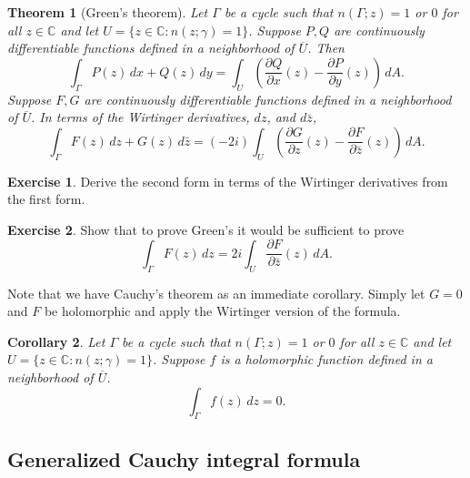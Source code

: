 \documentclass[12pt,openany]{book}
\newcommand{\C}{{\mathbb{C}}}
\theoremstyle{plain}
\newtheorem{thm}{Theorem}[section]
\newtheorem{cor}[thm]{Corollary}
\theoremstyle{remark}
\theoremstyle{definition}
\newenvironment{exbox}{%
    \def\FrameCommand{\vrule width 1pt \relax\hspace {10pt}}%
    \MakeFramed {\advance \hsize -\width \FrameRestore }%
}{%
    \endMakeFramed
}
\theoremstyle{exercise}
\newtheorem{exercise}{Exercise}[section]
\theoremstyle{example}
\begin{document}
\begin{thm}[Green's theorem] \label{thm:greens}
Let $\Gamma$ be a cycle
such that $n(\Gamma;z) = 1$ or $0$ for all $z \in \C$ and let $U = \{ z \in \C : n(z;\gamma) = 1 \}$.
Suppose 
$P,Q$ are continuously differentiable functions defined in a neighborhood
of $\overline{U}$.
Then
\begin{equation*}
\int_{\Gamma} P(z) \, dx + Q(z) \, dy
=
\int_{U}
\left(
\frac{\partial Q}{\partial x}(z)
-
\frac{\partial P}{\partial y}(z)
\right)
\, dA .
\end{equation*}
Suppose $F,G$ are continuously differentiable functions defined in a neighborhood
of $\overline{U}$.
In terms of the Wirtinger derivatives, $dz$, and $d \bar{z}$,
\begin{equation*}
\int_{\Gamma} F(z) \, dz + G(z) \, d\bar{z}
=
(-2i)
\int_{U}
\left(
\frac{\partial G}{\partial z}(z)
-
\frac{\partial F}{\partial \bar{z}}(z)
\right)
\, dA .
\end{equation*}
\end{thm}

\begin{exbox}
\begin{exercise}
Derive the second form in terms of the Wirtinger derivatives from the first
form.
\end{exercise}

\begin{exercise}
Show that to prove Green's it would be sufficient to prove
\begin{equation*}
\int_{\Gamma} F(z) \, dz
=
2i
\int_{U}
\frac{\partial F}{\partial \bar{z}}(z)
\, dA .
\end{equation*}
\end{exercise}
\end{exbox}

Note that we have Cauchy's theorem as an immediate corollary.  Simply let
$G=0$ and $F$ be holomorphic and apply the Wirtinger version of the formula.

\begin{cor}\label{thm:cauchybygreen}
Let $\Gamma$ be a cycle
such that $n(\Gamma;z) = 1$ or $0$ for all $z \in \C$ and let $U = \{ z \in \C : n(z;\gamma) = 1 \}$.
Suppose $f$ is a holomorphic function defined in a neighborhood of $\overline{U}$.
\begin{equation*}
\int_{\Gamma} f(z) \, dz  = 0.
\end{equation*}
\end{cor}

\subsection{Generalized Cauchy integral formula}
\end{document}
